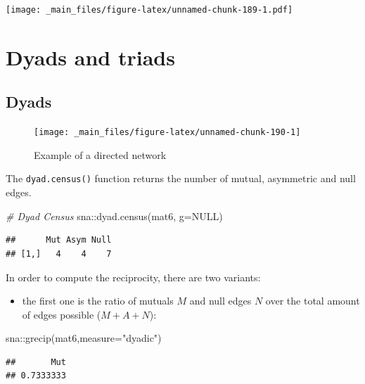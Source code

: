 \documentclass[
  notitlepage,
  onecolumn,
  openany]{book}
\newenvironment{Shaded}{\begin{snugshade}}{\end{snugshade}}
\newcommand{\AttributeTok}[1]{\textcolor[rgb]{0.77,0.63,0.00}{#1}}
\newcommand{\CommentTok}[1]{\textcolor[rgb]{0.56,0.35,0.01}{\textit{#1}}}
\newcommand{\ConstantTok}[1]{\textcolor[rgb]{0.00,0.00,0.00}{#1}}
\newcommand{\FunctionTok}[1]{\textcolor[rgb]{0.00,0.00,0.00}{#1}}
\newcommand{\NormalTok}[1]{#1}
\newcommand{\SpecialCharTok}[1]{\textcolor[rgb]{0.00,0.00,0.00}{#1}}
\newcommand{\StringTok}[1]{\textcolor[rgb]{0.31,0.60,0.02}{#1}}
\providecommand{\tightlist}{%
  \setlength{\itemsep}{0pt}\setlength{\parskip}{0pt}}
\begin{document}
\texttt{[image: \_main\_files/figure-latex/unnamed-chunk-189-1.pdf]}

\hypertarget{dyads-and-triads}{%
\chapter{Dyads and triads}\label{dyads-and-triads}}

\hypertarget{dyads-1}{%
\section{Dyads}\label{dyads-1}}

\begin{figure}
\texttt{[image: \_main\_files/figure-latex/unnamed-chunk-190-1]} \caption{Example of a directed network}\label{fig:unnamed-chunk-190}
\end{figure}

The \texttt{dyad.census()} function returns the number of mutual, asymmetric and null edges.

\begin{Shaded}
\begin{Highlighting}[]
\CommentTok{\# Dyad Census}
\NormalTok{sna}\SpecialCharTok{::}\FunctionTok{dyad.census}\NormalTok{(mat6, }\AttributeTok{g=}\ConstantTok{NULL}\NormalTok{)}
\end{Highlighting}
\end{Shaded}

\begin{verbatim}
##      Mut Asym Null
## [1,]   4    4    7
\end{verbatim}

In order to compute the reciprocity, there are two variants:

\begin{itemize}
\tightlist
\item
  the first one is the ratio of mutuals \(M\) and null edges \(N\) over the total amount of edges possible (\(M+A+N\)):
\end{itemize}

\begin{Shaded}
\begin{Highlighting}[]
\NormalTok{sna}\SpecialCharTok{::}\FunctionTok{grecip}\NormalTok{(mat6,}\AttributeTok{measure=}\StringTok{"dyadic"}\NormalTok{)}
\end{Highlighting}
\end{Shaded}

\begin{verbatim}
##       Mut 
## 0.7333333
\end{verbatim}
\end{document}
